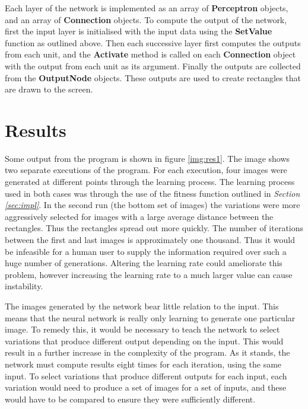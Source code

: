\documentclass{acm_proc_article-sp}
\begin{document}
\vspace{3mm}

Each layer of the network is implemented as an array of \textbf{Perceptron} objects, and an array of \textbf{Connection} objects. To compute the output of the network, first the input layer is initialised with the input data using the \textbf{SetValue} function as outlined above. Then each successive layer first computes the outputs from each unit, and the \textbf{Activate} method is called on each \textbf{Connection} object with the output from each unit as its argument. Finally the outputs are collected from the \textbf{OutputNode} objects. These outputs are used to create rectangles that are drawn to the screen. 

\section{Results}
\label{sec:results}

Some output from the program is shown in figure \ref{img:res1}. The image shows two separate executions of the program. For each execution, four images were generated at different points through the learning process. The learning process used in both cases was through the use of the fitness function outlined in \textit{Section \ref{sec:impl}}. In the second run (the bottom set of images) the variations were more aggressively selected for images with a large average distance between the rectangles. Thus the rectangles spread out more quickly. The number of iterations between the first and last images is approximately one thousand. Thus it would be infeasible for a human user to supply the information required over such a huge number of generations. Altering the learning rate could ameliorate this problem, however increasing the learning rate to a much larger value can cause instability. 

\vspace{3mm}

The images generated by the network bear little relation to the input. This means that the neural network is really only learning to generate one particular image. To remedy this, it would be necessary to teach the network to select variations that produce different output depending on the input. This would result in a further increase in the complexity of the program. As it stands, the network must compute results eight times for each iteration, using the same input. To select variations that produce different outputs for each input, each variation would need to produce a set of images for a set of inputs, and these would have to be compared to ensure they were sufficiently different. 
\end{document}
